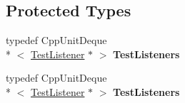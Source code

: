 \subsection*{Protected Types}
\begin{DoxyCompactItemize}
\item 
\hypertarget{class_test_result_a781741f5636cab07026c43e141781d19}{typedef Cpp\+Unit\+Deque\\*
$<$ \hyperlink{class_test_listener}{Test\+Listener} $\ast$ $>$ {\bfseries Test\+Listeners}}\label{class_test_result_a781741f5636cab07026c43e141781d19}

\item 
\hypertarget{class_test_result_a781741f5636cab07026c43e141781d19}{typedef Cpp\+Unit\+Deque\\*
$<$ \hyperlink{class_test_listener}{Test\+Listener} $\ast$ $>$ {\bfseries Test\+Listeners}}\label{class_test_result_a781741f5636cab07026c43e141781d19}

\end{DoxyCompactItemize}
